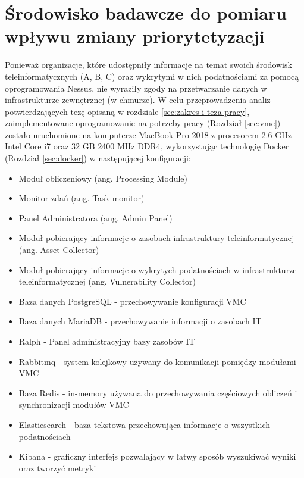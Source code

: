 \section{Środowisko badawcze do pomiaru wpływu zmiany priorytetyzacji}
\label{sec:desc_pio}
Ponieważ organizacje, które udostępniły informacje na temat swoich środowisk teleinformatycznych (A, B, C) oraz wykrytymi w nich podatnościami za pomocą oprogramowania Nessus, nie wyraziły zgody na przetwarzanie danych w infrastrukturze zewnętrznej (w chmurze). W celu przeprowadzenia analiz potwierdzających tezę opisaną w rozdziale \ref{sec:zakres-i-teza-pracy}, zaimplementowane oprogramowanie na potrzeby pracy (Rozdział \ref{sec:vmc}) zostało uruchomione na komputerze MacBook Pro 2018 z procesorem 2.6 GHz Intel Core i7 oraz 32 GB 2400 MHz DDR4, wykorzystując technologię Docker (Rozdział \ref{sec:docker}) w następującej konfiguracji:
\begin{itemize}
\item Moduł obliczeniowy (ang. Processing Module) 
\item Monitor zdań (ang. Task monitor)
\item Panel Administratora (ang. Admin Panel)
\item Moduł pobierający informacje o zasobach infrastruktury teleinformatycznej (ang. Asset Collector)
\item Moduł pobierający informacje o wykrytych podatnościach w infrastrukturze teleinformatycznej (ang. Vulnerability Collector)
\item Baza danych PostgreSQL \cite{postgresql1996postgresql} - przechowywanie konfiguracji VMC 
\item Baza danych MariaDB \cite{bartholomew2012mariadb} - przechowywanie informacji o zasobach IT
\item Ralph \cite{ralph} - Panel administracyjny bazy zasobów IT 
\item Rabbitmq \cite{johansson2020rabbitmq} - system kolejkowy używany do komunikacji pomiędzy modułami VMC 
\item Baza Redis \cite{chen2016towards} - in-memory używana do przechowywania częściowych obliczeń i synchronizacji modułów VMC 
\item Elasticsearch  \cite{dixit2016elasticsearch} - baza tekstowa przechowująca informacje o wszystkich podatnościach 
\item Kibana \cite{gupta2015kibana} - graficzny interfejs pozwalający w łatwy sposób wyszukiwać wyniki oraz tworzyć metryki 
\end{itemize}

